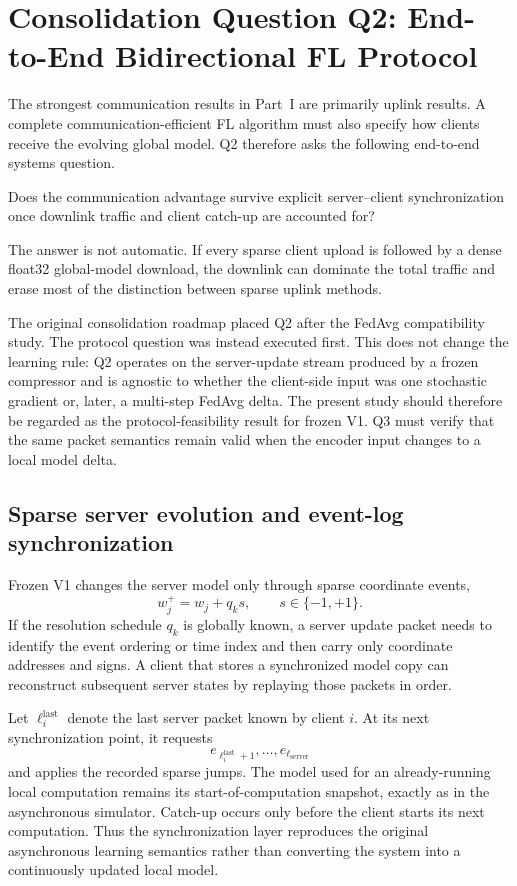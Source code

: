 \section{Consolidation Question Q2: End-to-End Bidirectional FL Protocol}
\label{sec:consolidation-q2}

The strongest communication results in Part~I are primarily uplink results. A complete communication-efficient FL algorithm must also specify how clients receive the evolving global model. Q2 therefore asks the following end-to-end systems question.
\begin{takeawaybox}[title={Q2 question}]
Does the communication advantage survive explicit server--client synchronization once downlink traffic and client catch-up are accounted for?
\end{takeawaybox}
The answer is not automatic. If every sparse client upload is followed by a dense float32 global-model download, the downlink can dominate the total traffic and erase most of the distinction between sparse uplink methods.

The original consolidation roadmap placed Q2 after the FedAvg compatibility study. The protocol question was instead executed first. This does not change the learning rule: Q2 operates on the server-update stream produced by a frozen compressor and is agnostic to whether the client-side input was one stochastic gradient or, later, a multi-step FedAvg delta. The present study should therefore be regarded as the protocol-feasibility result for frozen V1. Q3 must verify that the same packet semantics remain valid when the encoder input changes to a local model delta.

\subsection{Sparse server evolution and event-log synchronization}

Frozen V1 changes the server model only through sparse coordinate events,
\begin{equation}
    w_j^+=w_j+q_k s,
    \qquad s\in\{-1,+1\}.
\end{equation}
If the resolution schedule $q_k$ is globally known, a server update packet needs to identify the event ordering or time index and then carry only coordinate addresses and signs. A client that stores a synchronized model copy can reconstruct subsequent server states by replaying those packets in order.

Let $\ell_i^{\mathrm{last}}$ denote the last server packet known by client $i$. At its next synchronization point, it requests
\begin{equation}
    e_{\ell_i^{\mathrm{last}}+1},\ldots,e_{\ell_{\mathrm{server}}}
\end{equation}
and applies the recorded sparse jumps. The model used for an already-running local computation remains its start-of-computation snapshot, exactly as in the asynchronous simulator. Catch-up occurs only before the client starts its next computation. Thus the synchronization layer reproduces the original asynchronous learning semantics rather than converting the system into a continuously updated local model.

